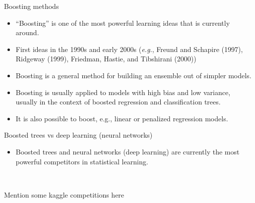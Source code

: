 \documentclass[
  10pt,
  ignorenonframetext,
]{beamer}
\providecommand{\tightlist}{%
  \setlength{\itemsep}{0pt}\setlength{\parskip}{0pt}}
\begin{document}
\begin{frame}
\begin{block}{Boosting methods}
\protect\hypertarget{boosting-methods}{}
\(~\)

\begin{itemize}
\tightlist
\item
  ``Boosting'' is one of the most powerful learning ideas that is
  currently around.
\end{itemize}

\vspace{2mm}

\begin{itemize}
\tightlist
\item
  First ideas in the 1990s and early 2000s (\emph{e.g.}, Freund and
  Schapire (1997), Ridgeway (1999), Friedman, Hastie, and Tibshirani
  (2000))
\end{itemize}

\vspace{2mm}

\begin{itemize}
\tightlist
\item
  Boosting is a general method for building an ensemble out of simpler
  models.
\end{itemize}

\vspace{2mm}

\begin{itemize}
\tightlist
\item
  Boosting is usually applied to models with high bias and low variance,
  usually in the context of boosted regression and classification trees.
\end{itemize}

\vspace{2mm}

\begin{itemize}
\tightlist
\item
  It is also possible to boost, e.g., linear or penalized regression
  models.
\end{itemize}
\end{block}
\end{frame}

\begin{frame}
\begin{block}{Boosted trees vs deep learning (neural networks)}
\protect\hypertarget{boosted-trees-vs-deep-learning-neural-networks}{}
\(~\)

\begin{itemize}
\tightlist
\item
  Boosted trees and neural networks (deep learning) are currently the
  most powerful competitors in statistical learning.
\end{itemize}

\(~\)

Mention some kaggle competitions here
\end{block}
\end{frame}
\end{document}
